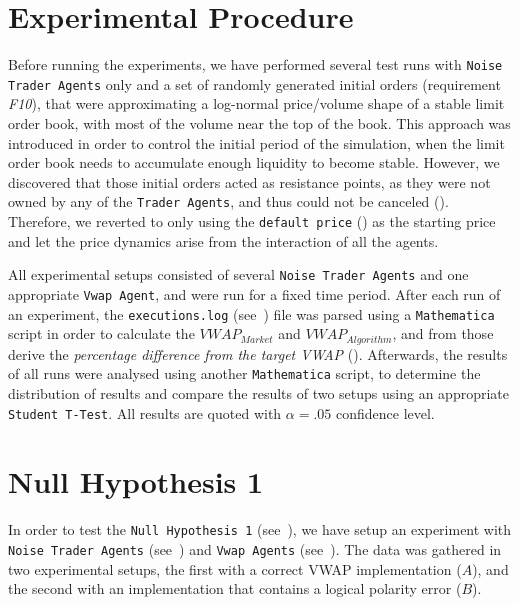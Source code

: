 \section{Experimental Procedure}
\label{Chapters/Experiments-and-Results/Experimental-Procedure}
Before running the experiments, we have performed several test runs with \texttt{Noise Trader Agents} only and a set of randomly generated initial orders (requirement \textit{F10}), that were approximating a log-normal price/volume shape of a stable limit order book, with most of the volume near the top of the book. This approach was introduced in order to control the initial period of the simulation, when the limit order book needs to accumulate enough liquidity to become stable. However, we discovered that those initial orders acted as resistance points, as they were not owned by any of the \texttt{Trader Agents}, and thus could not be canceled (). Therefore, we reverted to only using the \texttt{default price} () as the starting price and let the price dynamics arise from the interaction of all the agents. 

All experimental setups consisted of several \texttt{Noise Trader Agents} and one appropriate \texttt{Vwap Agent}, and were run for a fixed time period. After each run of an experiment, the \texttt{executions.log} (see~) file was parsed using a \texttt{Mathematica}~\cite{Mathematica} script in order to calculate the $VWAP_{Market}$ and $VWAP_{Algorithm}$, and from those derive the \textit{percentage difference from the target VWAP} (). Afterwards, the results of all runs were analysed using another \texttt{Mathematica} script, to determine the distribution of results and compare the results of two setups using an appropriate \texttt{Student T-Test}. All results are quoted with $\alpha=.05$ confidence level.

\FloatBarrier
\section{Null Hypothesis 1}
\label{Chapters/Experiments-and-Results/Null-Hypothesis-1}
In order to test the \texttt{Null Hypothesis 1} (see~), we have setup an experiment with \texttt{Noise Trader Agents} (see~) and \texttt{Vwap Agents} (see~). The data was gathered in two experimental setups, the first with a correct VWAP implementation ($A$), and the second with an implementation that contains a logical polarity error ($B$).

